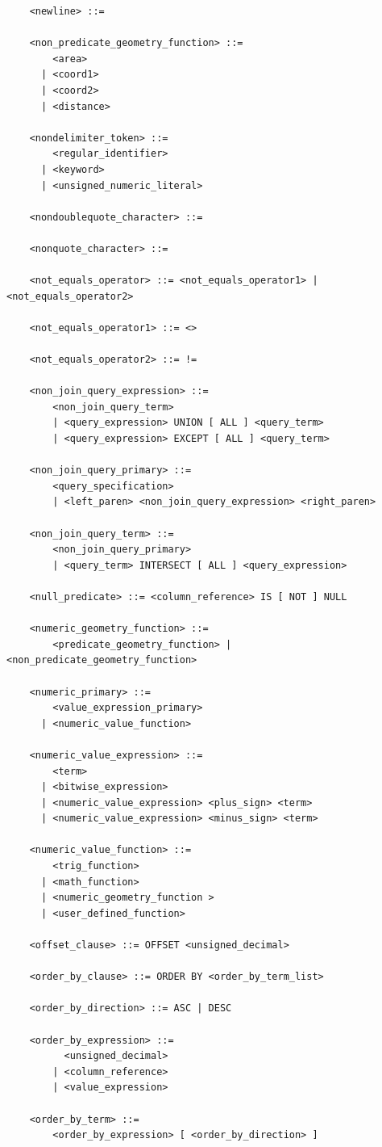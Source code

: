 \documentclass[11pt,a4paper]{ivoa}
\begin{document}
\begin{verbatim}
    <newline> ::=

    <non_predicate_geometry_function> ::=
        <area>
      | <coord1>
      | <coord2>
      | <distance>

    <nondelimiter_token> ::=
        <regular_identifier>
      | <keyword>
      | <unsigned_numeric_literal>

    <nondoublequote_character> ::=

    <nonquote_character> ::=

    <not_equals_operator> ::= <not_equals_operator1> | <not_equals_operator2>

    <not_equals_operator1> ::= <>

    <not_equals_operator2> ::= !=

    <non_join_query_expression> ::=
        <non_join_query_term>
        | <query_expression> UNION [ ALL ] <query_term>
        | <query_expression> EXCEPT [ ALL ] <query_term>

    <non_join_query_primary> ::=
        <query_specification>
        | <left_paren> <non_join_query_expression> <right_paren>

    <non_join_query_term> ::=
        <non_join_query_primary>
        | <query_term> INTERSECT [ ALL ] <query_expression>

    <null_predicate> ::= <column_reference> IS [ NOT ] NULL

    <numeric_geometry_function> ::=
        <predicate_geometry_function> | <non_predicate_geometry_function>

    <numeric_primary> ::=
        <value_expression_primary>
      | <numeric_value_function>

    <numeric_value_expression> ::=
        <term>
      | <bitwise_expression>
      | <numeric_value_expression> <plus_sign> <term>
      | <numeric_value_expression> <minus_sign> <term>

    <numeric_value_function> ::=
        <trig_function>
      | <math_function>
      | <numeric_geometry_function >
      | <user_defined_function>

    <offset_clause> ::= OFFSET <unsigned_decimal>

    <order_by_clause> ::= ORDER BY <order_by_term_list>

    <order_by_direction> ::= ASC | DESC

    <order_by_expression> ::=
          <unsigned_decimal>
        | <column_reference>
        | <value_expression>

    <order_by_term> ::=
        <order_by_expression> [ <order_by_direction> ]


\end{verbatim}
\end{document}
